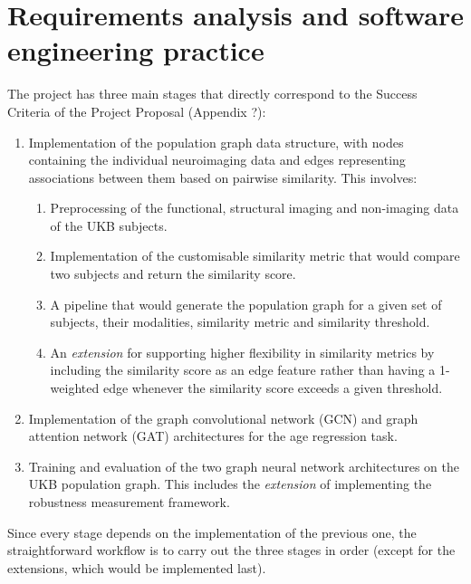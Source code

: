 

\section{Requirements analysis and software engineering practice}

The project has three main stages that directly correspond to the Success Criteria of the Project Proposal (Appendix ?):

\begin{enumerate}
    \item Implementation of the population graph data structure, with nodes containing the individual neuroimaging data and edges representing associations between them based on pairwise similarity. This involves: \begin{enumerate}
        \item Preprocessing of the functional, structural imaging and non-imaging data of the UKB subjects.
        \item Implementation of the customisable similarity metric that would compare two subjects and return the similarity score.
        \item A pipeline that would generate the population graph for a given set of subjects, their modalities, similarity metric and similarity threshold.
        \item An \textit{extension} for supporting higher flexibility in similarity metrics by including the similarity score as an edge feature rather than having a 1-weighted edge whenever the similarity score exceeds a given threshold.
    \end{enumerate}
    \item Implementation of the graph convolutional network (GCN) and graph attention network (GAT) architectures for the age regression task. 
    \item Training and evaluation of the two graph neural network architectures on the UKB population graph. This includes the \textit{extension} of implementing the robustness measurement framework.
\end{enumerate}

Since every stage depends on the implementation of the previous one, the straightforward workflow is to carry out the three stages in order (except for the extensions, which would be implemented last). 

